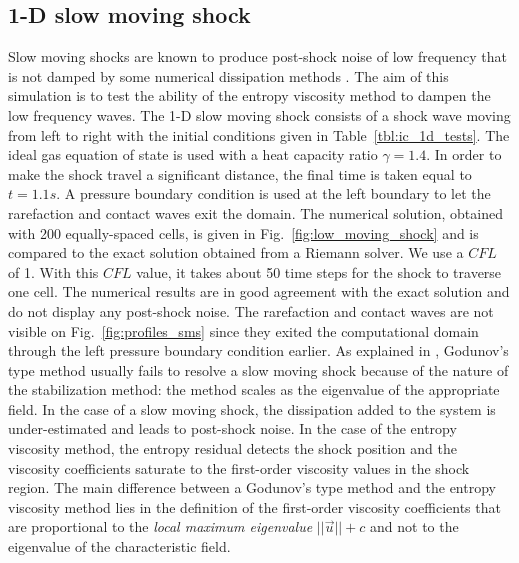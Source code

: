 \documentclass[preprint,10pt]{elsarticle}
\newcommand{\fig}[1]{Fig.~\ref{#1}}                      %
\newcommand{\tbl}[1]{Table~\ref{#1}}                     %
\begin{document}
\subsection{1-D slow moving shock} \label{sec:slow_moving_shock}

Slow moving shocks are known to produce post-shock noise of low frequency that is not damped by some numerical dissipation methods \cite{james}. The aim of this simulation is to test the ability of the entropy viscosity method to dampen the low frequency waves.
The 1-D slow moving shock consists of a shock wave moving from left to right with the initial conditions given in \tbl{tbl:ic_1d_tests}. The ideal gas equation of state is used with a heat capacity ratio $\gamma=1.4$.  In order to make the shock travel a significant distance, the final time is taken equal to $t=1.1s$. A pressure boundary condition is used at the left boundary to let the rarefaction and contact waves exit the domain.   
%
The numerical solution, obtained with 200 equally-spaced cells, is given in \fig{fig:low_moving_shock} and is compared to the exact solution obtained from a Riemann solver. We use a $CFL$ of 1. With this $CFL$ value, it takes about 50 time steps for the shock to traverse one cell.
%
The numerical results are in good agreement with the exact solution and do not display any post-shock noise. The rarefaction and contact waves are not visible on \fig{fig:profiles_sms} since they exited the computational domain through the left pressure boundary condition earlier. As explained in \cite{roberts}, Godunov's type method usually fails to resolve a slow moving shock because of the nature of the stabilization method: the method scales as the eigenvalue of the appropriate field. In the case of a slow moving shock, the dissipation added to the system is under-estimated and leads to post-shock noise. In the case of the entropy viscosity method, the entropy residual detects the shock position and the viscosity coefficients saturate to the first-order viscosity values in the shock region. The main difference between a  Godunov's type method and the entropy viscosity method lies in the definition of the first-order viscosity coefficients that are proportional to the \emph{local maximum eigenvalue} $||\vec{u}||+c$ and not to the eigenvalue of the characteristic field.
%
\end{document}
